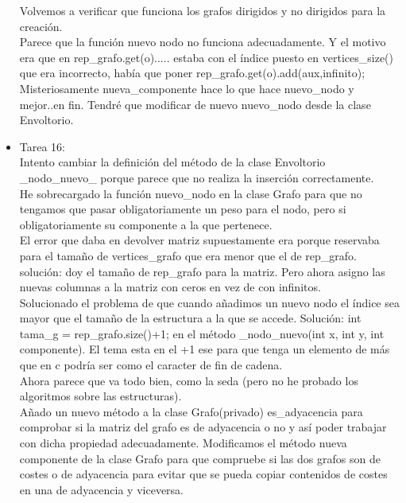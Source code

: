 \begin{itemize}
Volvemos a verificar que funciona los grafos dirigidos y no dirigidos para la creación.\\

Parece que la función nuevo nodo no funciona adecuadamente. Y el motivo era que en rep\_grafo.get(o)..... estaba con el índice puesto en vertices\_size() que era incorrecto, había que poner rep\_grafo.get(o).add(aux,infinito);\\



Misteriosamente nueva\_componente hace lo que hace nuevo\_nodo y mejor..en fin. Tendré que modificar de nuevo nuevo\_nodo desde la clase Envoltorio.\\

\item Tarea 16:\\

Intento cambiar la definición del método de la clase Envoltorio \_nodo\_nuevo\_ porque parece que no realiza la inserción correctamente.\\

He sobrecargado la función nuevo\_nodo en la clase Grafo para que no tengamos que pasar obligatoriamente un peso para el nodo, pero si obligatoriamente su componente a la que pertenece.\\

El error que daba en devolver matriz supuestamente era porque reservaba para el tamaño de vertices\_grafo que era menor que el de rep\_grafo. solución: doy el tamaño de rep\_grafo para la matriz. Pero ahora asigno las nuevas columnas a la matriz con ceros en vez de con infinitos.\\

Solucionado el problema de que cuando añadimos un nuevo nodo el índice sea mayor que el tamaño de la estructura a la que se accede. Solución: int tama\_g = rep\_grafo.size()+1; en el método \_nodo\_nuevo(int x, int y, int componente). El tema esta en el +1 ese para que tenga un elemento de más que en c podría ser como el caracter de fin de cadena. \\

Ahora parece que va todo bien, como la seda (pero no he probado los algoritmos sobre las estructuras).\\

Añado un nuevo método a la clase Grafo(privado) es\_adyacencia para comprobar si la matriz del grafo es de adyacencia o no y así poder trabajar con dicha propiedad adecuadamente. Modificamos el método nueva componente de la clase Grafo para que compruebe si las dos grafos son de costes o de adyacencia para evitar que se pueda copiar contenidos de costes en una de adyacencia y viceversa.\\


\end{itemize}
